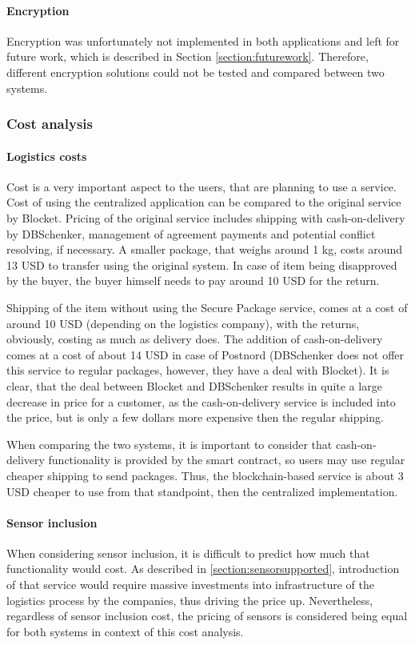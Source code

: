 \paragraph{Encryption}
Encryption was unfortunately not implemented in both applications and left for future work, which is described in Section \ref{section:futurework}. Therefore, different encryption solutions could not be tested and compared between two systems.

\subsubsection{Cost analysis} \label{section:costpractical}

\paragraph{Logistics costs}
Cost is a very important aspect to the users, that are planning to use a service. Cost of using the centralized application can be compared to the original service by Blocket. Pricing of the original service includes shipping with cash-on-delivery \citep{cod} by DBSchenker, management of agreement payments and potential conflict resolving, if necessary. A smaller package, that weighs around 1 kg, costs around 13 USD to transfer using the original system. In case of item being disapproved by the buyer, the buyer himself needs to pay around 10 USD for the return. 

Shipping of the item without using the Secure Package service, comes at a cost of around 10 USD (depending on the logistics company), with the returns, obviously, costing as much as delivery does. The addition of cash-on-delivery comes at a cost of about 14 USD in case of Postnord (DBSchenker does not offer this service to regular packages, however, they have a deal with Blocket). It is clear, that the deal between Blocket and DBSchenker results in quite a large decrease in price for a customer, as the cash-on-delivery service is included into the price, but is only a few dollars more expensive then the regular shipping.

When comparing the two systems, it is important to consider that cash-on-delivery functionality is provided by the smart contract, so users may use regular cheaper shipping to send packages. Thus, the blockchain-based service is about 3 USD cheaper to use from that standpoint, then the centralized implementation.

\paragraph{Sensor inclusion}
When considering sensor inclusion, it is difficult to predict how much that functionality would cost. As described in \ref{section:sensorsupported}, introduction of that service would require massive investments into infrastructure of the logistics process by the companies, thus driving the price up. Nevertheless, regardless of sensor inclusion cost, the pricing of sensors is considered being equal for both systems in context of this cost analysis.


